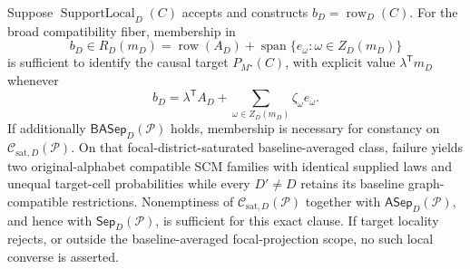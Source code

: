 Suppose \(\operatorname{SupportLocal}_D(C)\) accepts and constructs \(b_D=\operatorname{row}_D(C)\).  For the broad compatibility fiber, membership in
\[
b_D\in R_D(m_D)
=\operatorname{row}(A_D)+
\operatorname{span}\{e_\omega:\omega\in Z_D(m_D)\}
\]
is sufficient to identify the causal target \(P_{M^\star}(C)\), with explicit value \(\lambda^{\mathsf T}m_D\) whenever
\[
b_D=\lambda^{\mathsf T}A_D+
\sum_{\omega\in Z_D(m_D)}\zeta_\omega e_\omega.
\]
If additionally \(\mathsf{BASep}_D(\mathcal P)\) holds, membership is necessary for constancy on \(\mathcal C_{\mathrm{sat},D}(\mathcal P)\).  On that focal-district-saturated baseline-averaged class, failure yields two original-alphabet compatible SCM families with identical supplied laws and unequal target-cell probabilities while every \(D'\ne D\) retains its baseline graph-compatible restrictions.  Nonemptiness of \(\mathcal C_{\mathrm{sat},D}(\mathcal P)\) together with \(\mathsf{ASep}_D(\mathcal P)\), and hence with \(\mathsf{Sep}_D(\mathcal P)\), is sufficient for this exact clause.  If target locality rejects, or outside the baseline-averaged focal-projection scope, no such local converse is asserted.